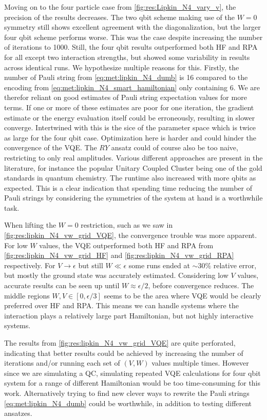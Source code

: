 Moving on to the four particle case from \cref{fig:res:Lipkin_N4_vary_v}, the precision of the results decreases. The two qbit scheme making use of the $W=0$ symmetry still shows excellent agreement with the diagonalization, but the larger four qbit scheme performs worse. This was the case despite increasing the number of iterations to 1000. Still, the four qbit results outperformed both HF and RPA for all except two interaction strengths, but showed some variability in results across identical runs. We hypothesize multiple reasons for this. Firstly, the number of Pauli string from \cref{eq:met:lipkin_N4_dumb} is 16 compared to the encoding from \cref{eq:met:lipkin_N4_smart_hamiltonian} only containing 6. We are therefor reliant on good estimates of Pauli string expectation values for more terms. If one or more of these estimates are poor for one iteration, the gradient estimate or the energy evaluation itself could be erroneously, resulting in slower converge. Intertwined with this is the sice of the parameter space which is twice as large for the four qbit case. Optimization here is harder and could hinder the convergence of the VQE. The $RY$ ansatz could of course also be too naive, restricting to only real amplitudes. Various different approaches are present in the literature, for instance the popular Unitary Coupled Cluster \citep{peruzzoVariationalEigenvalueSolver2014} being one of the gold standards in quantum chemistry. 
The runtime also increased with more qbits as expected. This is a clear indication that spending time reducing the number of Pauli strings by considering the symmetries of the system at hand is a worthwhile task.

When lifting the $W=0$ restriction, such as we saw in \cref{fig:res:lipkin_N4_vw_grid_VQE}, the convergence trouble was more apparent. For low $W$ values, the VQE outperformed both HF and RPA from \cref{fig:res:lipkin_N4_vw_grid_HF} and \cref{fig:res:lipkin_N4_vw_grid_RPA} respectively. For $V\to\epsilon$ but still $W \ll \epsilon$ some runs ended at $\sim 30\%$ relative error, but mostly the ground state was accurately estimated. Considering low $V$ values, accurate results can be seen up until $W \approx \epsilon/2$, before convergence reduces. The middle regions $W,V \in [0,\epsilon/3]$ seems to be the area where VQE would be clearly preferred over HF and RPA. This means we can handle systems where the interaction plays a relatively large part Hamiltonian, but not highly interactive systems.

The results from \cref{fig:res:lipkin_N4_vw_grid_VQE} are quite perforated, indicating that better results could be achieved by increasing the number of iterations and/or running each set of $(V,W)$ values multiple times. However since we are simulating a QC, simulating repeated VQE calculations for four qbit system for a range of different Hamiltonian would be too time-consuming for this work. Alternatively trying to find new clever ways to rewrite the Pauli strings \cref{eq:met:lipkin_N4_dumb} could be worthwhile, in addition to testing different ansatzes.      

